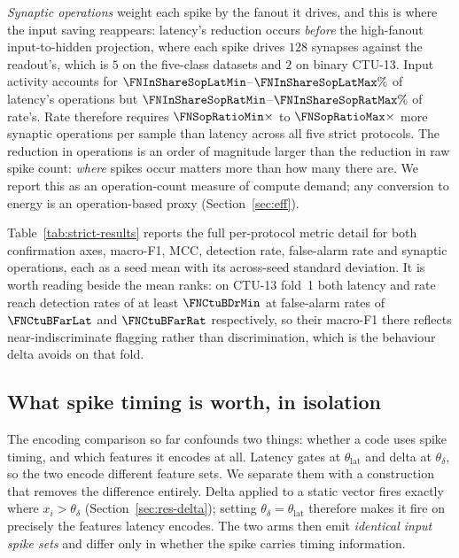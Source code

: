 \emph{Synaptic operations} weight each spike by the fanout it drives, and this is
where the input saving reappears: latency's reduction occurs \emph{before} the
high-fanout input-to-hidden projection, where each spike drives $128$ synapses
against the readout's, which is $5$ on the five-class datasets and $2$ on binary
CTU-13. Input activity accounts for
$\FNInShareSopLatMin$--$\FNInShareSopLatMax\%$ of latency's operations but
$\FNInShareSopRatMin$--$\FNInShareSopRatMax\%$ of rate's. Rate therefore requires
$\FNSopRatioMin\times$ to $\FNSopRatioMax\times$ more synaptic operations per
sample than latency across all five strict protocols. The reduction in
operations is an order of magnitude larger than the reduction in raw spike
count: \emph{where} spikes occur matters more than how many there are. We report
this as an operation-count measure of compute demand; any conversion to energy
is an operation-based proxy (Section~\ref{sec:eff}).

Table~\ref{tab:strict-results} reports the full per-protocol metric detail for
both confirmation axes, macro-F1, MCC, detection rate, false-alarm rate and
synaptic operations, each as a seed mean with its across-seed standard
deviation. It is worth reading beside the mean ranks: on CTU-13 fold~1 both
latency and rate reach detection rates of at least $\FNCtuBDrMin$ at
false-alarm rates of $\FNCtuBFarLat$ and $\FNCtuBFarRat$ respectively, so their
macro-F1 there reflects near-indiscriminate flagging rather
than discrimination, which is the behaviour delta avoids on that fold.

\subsection{What spike timing is worth, in isolation}
\label{sec:res-timing}

The encoding comparison so far confounds two things: whether a code uses spike
timing, and which features it encodes at all. Latency gates at
$\theta_\mathrm{lat}$ and delta at $\theta_\delta$, so the two encode different
feature sets. We separate them with a construction that removes the difference
entirely. Delta applied to a static vector fires exactly where
$x_i>\theta_\delta$ (Section~\ref{sec:res-delta}); setting
$\theta_\delta=\theta_\mathrm{lat}$ therefore makes it fire on precisely the
features latency encodes. The two arms then emit \emph{identical input spike
sets} and differ only in whether the spike carries timing information.

